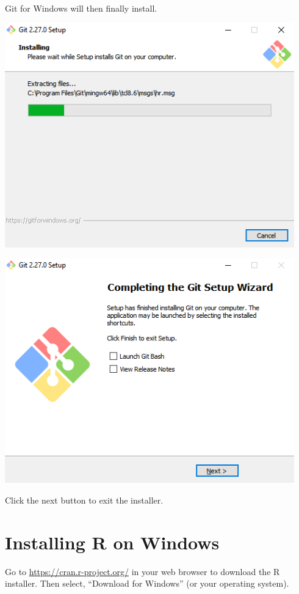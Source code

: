 \documentclass[
]{book}
\begin{document}
Git for Windows will then finally install.

\includegraphics{images/05-git_14.png}

\includegraphics{images/05-git_15.png}

Click the next button to exit the installer.

\hypertarget{installing-r-on-windows}{%
\section*{Installing R on Windows}\label{installing-r-on-windows}}

Go to \url{https://cran.r-project.org/} in your web browser to download the R installer. Then select, ``Download for Windows'' (or your operating system).
\end{document}
